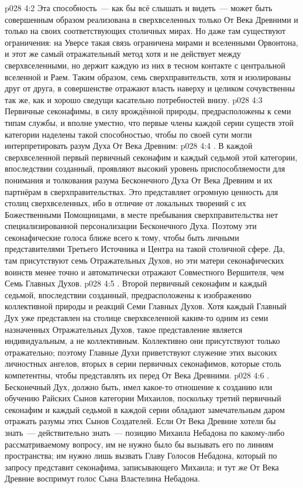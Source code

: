 \vs p028 4:2 Эта способность~--- как бы всё слышать и видеть~--- может быть совершенным образом реализована в сверхвселенных только От Века Древними и только на своих соответствующих столичных мирах. Но даже там существуют ограничения: на Уверсе такая связь ограничена мирами и вселенными Орвонтона, и этот же самый отражательный метод хотя и не действует между сверхвселенными, но держит каждую из них в тесном контакте с центральной вселенной и Раем. Таким образом, семь сверхправительств, хотя и изолированы друг от друга, в совершенстве отражают власть наверху и целиком сочувственны так же, как и хорошо сведущи касательно потребностей внизу.
\vs p028 4:3 \pc Первичные секонафимы, в силу врождённой природы, предрасположены к семи типам службы, и вполне уместно, что первые члены каждой серии существ этой категории наделены такой способностью, чтобы по своей сути могли интерпретировать разум Духа От Века Древним:
\vs p028 4:4 . В каждой сверхвселенной первый первичный секонафим и каждый седьмой этой категории, впоследствии созданный, проявляют высокий уровень приспособляемости для понимания и толкования разума Бесконечного Духа От Века Древним и их партнёрам в сверхправительствах. Это представляет огромную ценность для столиц сверхвселенных, ибо в отличие от локальных творений с их Божественными Помощницами, в месте пребывания сверхправительства нет специализированной персонализации Бесконечного Духа. Поэтому эти секонафические голоса ближе всего к тому, чтобы быть личными представителями Третьего Источника и Центра на такой столичной сфере. Да, там присутствуют семь Отражательных Духов, но эти матери секонафических воинств менее точно и автоматически отражают Совместного Вершителя, чем Семь Главных Духов.
\vs p028 4:5 . Второй первичный секонафим и каждый седьмой, впоследствии созданный, предрасположены к изображению коллективной природы и реакций Семи Главных Духов. Хотя каждый Главный Дух уже представлен на столице сверхвселенной каким\hyp{}то одним из семи назначенных Отражательных Духов, такое представление является индивидуальным, а не коллективным. Коллективно они присутствуют только отражательно; поэтому Главные Духи приветствуют служение этих высоких личностных ангелов, вторых в серии первичных секонафимов, которые столь компетентны, чтобы представлять их перед От Века Древними.
\vs p028 4:6 . Бесконечный Дух, должно быть, имел какое\hyp{}то отношение к созданию или обучению Райских Сынов категории Михаилов, поскольку третий первичный секонафим и каждый седьмой в каждой серии обладают замечательным даром отражать разумы этих Сынов Создателей. Если От Века Древние хотели бы знать~--- действительно знать~--- позицию Михаила Небадона по какому\hyp{}либо рассматриваемому вопросу, им не нужно было бы вызывать его по линиям пространства; им нужно лишь вызвать Главу Голосов Небадона, который по запросу представит секонафима, записывающего Михаила; и тут же От Века Древние воспримут голос Сына Властелина Небадона.
